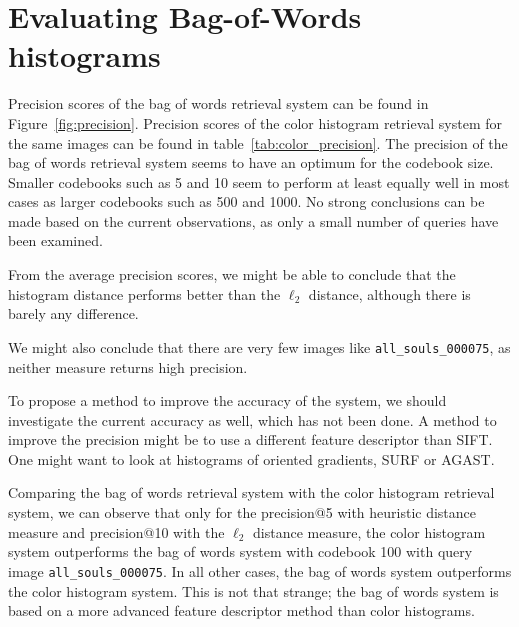 \documentclass[a4paper,10pt,twoside]{article}
\begin{document}
\section{Evaluating Bag-of-Words histograms}
Precision scores of the bag of words retrieval system can be found in Figure~\ref{fig:precision}.  Precision scores of the color histogram retrieval system for the same images can be found in table~\ref{tab:color_precision}.  The precision of the bag of words retrieval system seems to have an optimum for the codebook size.  Smaller codebooks such as 5 and 10 seem to perform at least equally well in most cases as larger codebooks such as 500 and 1000.  No strong conclusions can be made based on the current observations, as only a small number of queries have been examined.  

From the average precision scores, we might be able to conclude that the histogram distance performs better than the $\ell_2$ distance, although there is barely any difference.  

We might also conclude that there are very few images like \texttt{all\_souls\_000075}, as neither measure returns high precision.  

To propose a method to improve the accuracy of the system, we should investigate the current accuracy as well, which has not been done. A method to improve the precision might be to use a different feature descriptor than SIFT.  One might want to look at histograms of oriented gradients, SURF or AGAST.

Comparing the bag of words retrieval system with the color histogram retrieval system, we can observe that only for the precision@5 with heuristic distance measure and precision@10 with the $\ell_2$ distance measure, the color histogram system outperforms the bag of words system with codebook 100 with query image \texttt{all\_souls\_000075}.  In all other cases, the bag of words system outperforms the color histogram system.  This is not that strange; the bag of words system is based on a more advanced feature descriptor method than color histograms.
\end{document}
